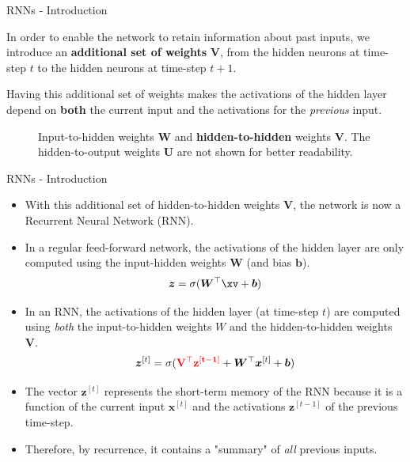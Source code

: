 \begin{frame} {RNNs - Introduction}
  \begin{itemize}
    \item \small{In order to enable the network to retain information about past inputs, we introduce an \textbf{additional set of weights} $\bm{V}$, from the hidden neurons at time-step $t$ to the hidden neurons at time-step $t+1$.
    \item Having this additional set of weights makes the activations of the hidden layer depend on \textbf{both} the current input and the activations for the \textit{previous} input.}
  \end{itemize}
  \begin{figure}
      \centering
      \caption{\footnotesize Input-to-hidden weights $\bm{W}$ and \textbf{hidden-to-hidden} weights $\bm{V}$. The hidden-to-output weights $\bm{U}$ are not shown for better readability.}
  \end{figure}
\end{frame}

\begin{frame} {RNNs - Introduction}
  \begin{itemize}
    \item With this additional set of hidden-to-hidden weights $\bm{V}$, the network is now a Recurrent Neural Network (RNN).
    \item In a regular feed-forward network, the activations of the hidden layer are only computed using the input-hidden weights $\bm{W}$ (and bias $\bm{b}$).
    $$\bm{z}= \sigma(\bm{W}^\top \xv + \bm{b})$$
    \item In an RNN, the activations of the hidden layer (at time-step $t$) are computed using \textit{both} the input-to-hidden weights $W$ and the hidden-to-hidden weights $\bm{V}$.
    $$\bm{z}^{[t]} = \sigma(\mathbf{\textcolor{red}{\bm{V}^\top\bm{z}^{[t-1]}}} + \bm{W}^\top \bm{x}^{[t]} + \bm{b})$$
    \item The vector $\bm{z}^{[t]}$ represents the short-term memory of the RNN because it is a function of the current input $\bm{x}^{[t]}$ and the activations $\bm{z}^{[t-1]}$ of the previous time-step.
    \item Therefore, by recurrence, it contains a "summary" of \textit{all} previous inputs. 
  \end{itemize}
\end{frame}

